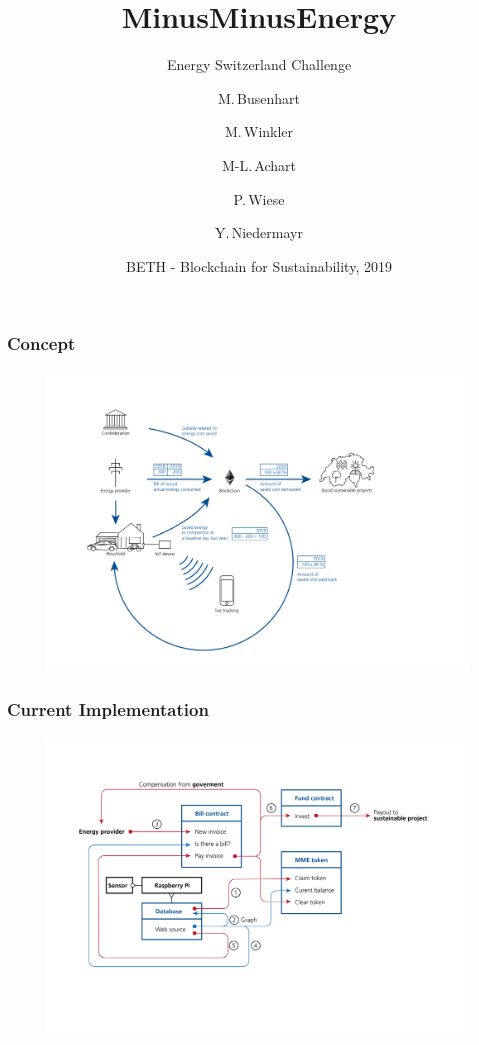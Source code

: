 \documentclass[t]{beamer}
\title{MinusMinusEnergy}
\subtitle{Energy Switzerland Challenge}
\author
{M.\,Busenhart \and M.\,Winkler \and M-L.\,Achart \\\and P.\,Wiese \and Y.\,Niedermayr}
\date[BETH 2019]
{BETH - Blockchain for Sustainability, 2019}
\begin{document}
  \frame{
    \titlepage
  }
  \begin{frame}
    \frametitle{Concept}
    \begin{figure}
    	 \vskip-2.1cm
    	\includegraphics[width=1.25\linewidth]{concept.png}
    \end{figure}
  \end{frame}

  \begin{frame}
		\frametitle{Current Implementation}
		\begin{figure}
			\vskip-1.95cm
			\hskip-2.1cm
			\includegraphics[width=1.2\linewidth]{implementation.png}
		\end{figure}
  \end{frame}
\end{document}
